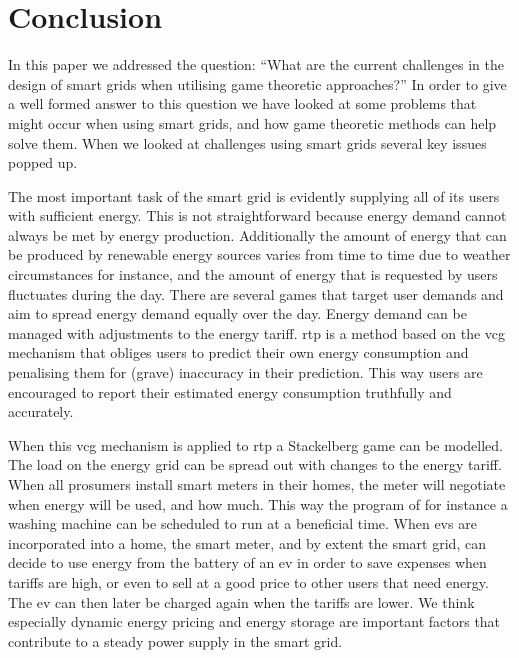\section{Conclusion}\label{conclusion}
\acresetall
In this paper we addressed the question: ``What are the current challenges in the design of smart grids when utilising game theoretic approaches?'' In order to give a well formed answer to this question we have looked at some problems that might occur when using smart grids, and how game theoretic methods can help solve them. When we looked at challenges using smart grids several key issues popped up. 

The most important task of the smart grid is evidently supplying all of its users with sufficient energy. This is not straightforward because energy demand cannot always be met by energy production. Additionally the amount of energy that can be produced by renewable energy sources varies from time to time due to weather circumstances for instance, and the amount of energy that is requested by users fluctuates during the day. There are several games that target user demands and aim to spread energy demand equally over the day. Energy demand can be managed with adjustments to the energy tariff. \ac{rtp} is a method based on the \ac{vcg} mechanism that obliges users to predict their own energy consumption and penalising them for (grave) inaccuracy in their prediction. This way users are encouraged to report their estimated energy consumption truthfully and accurately. 

When this \ac{vcg} mechanism is applied to \ac{rtp} a Stackelberg game can be modelled. The load on the energy grid can be spread out with changes to the energy tariff. When all prosumers install smart meters in their homes, the meter will negotiate when energy will be used, and how much. This way the program of for instance a washing machine can be scheduled to run at a beneficial time. When \acp{ev} are incorporated into a home, the smart meter, and by extent the smart grid, can decide to use energy from the battery of an \ac{ev} in order to save expenses when tariffs are high, or even to sell at a good price to other users that need energy. The \ac{ev} can then later be charged again when the tariffs are lower. 
We think especially dynamic energy pricing and energy storage are important factors that contribute to a steady power supply in the smart grid.

